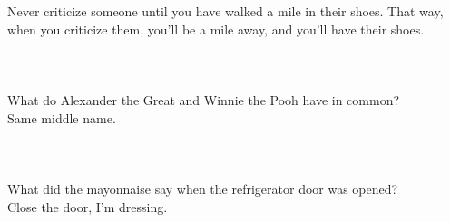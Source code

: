 
\usepackage{blindtext}



Never criticize someone until you have walked a mile in their shoes.
 That way, when you criticize them, you'll be a mile away, and you'll have their shoes.\\\\

\blindtext
\blindtext \\\\



What do Alexander the Great and Winnie the Pooh have in common?\\
 Same middle name.\\\\

\blindtext
\blindtext\\\\

What did the mayonnaise say when the refrigerator door was opened?\\
 Close the door, I'm dressing.\\\\

